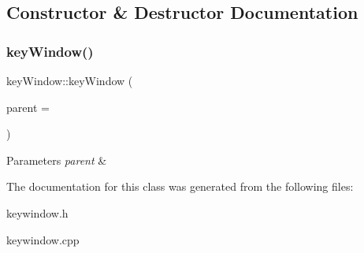 \subsection{Constructor \& Destructor Documentation}
\mbox{\label{classkey_window_a79110b19771e23a36eb3f08820bae125}} 
\subsubsection{\texorpdfstring{key\+Window()}{keyWindow()}}
{\footnotesize\ttfamily key\+Window\+::key\+Window (\begin{DoxyParamCaption}\item[{Q\+Widget $\ast$}]{parent = {} }\end{DoxyParamCaption})\hspace{0.3cm}{\ttfamily [explicit]}}


\begin{DoxyParams}{Parameters}
{\em parent} & \\
\hline
\end{DoxyParams}


The documentation for this class was generated from the following files\+:\begin{DoxyCompactItemize}
\item 
keywindow.\+h\item 
keywindow.\+cpp\end{DoxyCompactItemize}
